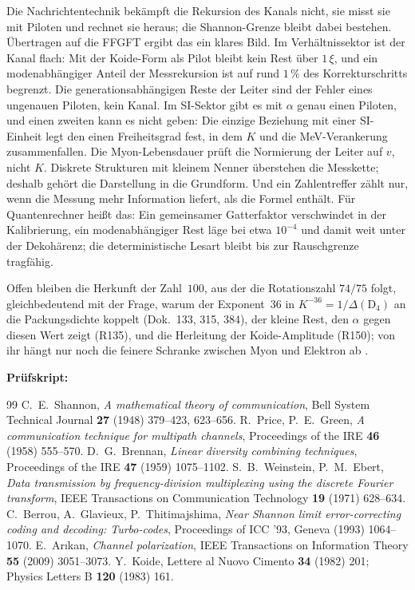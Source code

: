 Die Nachrichtentechnik bekämpft die Rekursion des Kanals nicht, sie misst sie mit Piloten und rechnet
sie heraus; die Shannon-Grenze bleibt dabei bestehen. Übertragen auf die FFGFT ergibt das ein klares
Bild. Im Verhältnissektor ist der Kanal flach: Mit der Koide-Form als Pilot bleibt kein Rest über
$1\,\xi$, und ein modenabhängiger Anteil der Messrekursion ist auf rund $1\,\%$ des Korrekturschritts
begrenzt. Die generationsabhängigen Reste der Leiter sind der Fehler eines ungenauen Piloten, kein
Kanal. Im SI-Sektor gibt es mit $\alpha$ genau einen Piloten, und einen zweiten kann es nicht geben: Die
einzige Beziehung mit einer SI-Einheit legt den einen Freiheitsgrad fest, in dem $K$ und die
MeV-Verankerung zusammenfallen. Die Myon-Lebensdauer prüft die Normierung der Leiter auf $v$, nicht $K$. Diskrete Strukturen mit kleinem Nenner überstehen die Messkette; deshalb gehört die Darstellung in
die Grundform. Und ein Zahlentreffer zählt nur, wenn die Messung mehr Information liefert, als die
Formel enthält. Für Quantenrechner heißt das: Ein gemeinsamer Gatterfaktor verschwindet in der
Kalibrierung, ein modenabhängiger Rest läge bei etwa $10^{-4}$ und damit weit unter der Dekohärenz;
die deterministische Lesart bleibt bis zur Rauschgrenze tragfähig.

Offen bleiben die Herkunft der Zahl~$100$, aus der die Rotationszahl $74/75$ folgt, gleichbedeutend
mit der Frage, warum der Exponent~$36$ in $K^{-36}=1/\Delta(\mathrm{D}_4)$ an die Packungsdichte koppelt
(Dok.~133, 315, 384),
der kleine Rest, den $\alpha$ gegen diesen Wert zeigt (R135), und die Herleitung der Koide-Amplitude (R150); von ihr hängt nur noch die feinere Schranke zwischen Myon und
Elektron ab \SM.

\medskip
\noindent\textbf{Prüfskript:} 

\begin{thebibliography}{99}
 C.~E.~Shannon, \textit{A mathematical theory of communication}, Bell System Technical Journal \textbf{27} (1948) 379--423, 623--656.
 R.~Price, P.~E.~Green, \textit{A communication technique for multipath channels}, Proceedings of the IRE \textbf{46} (1958) 555--570.
 D.~G.~Brennan, \textit{Linear diversity combining techniques}, Proceedings of the IRE \textbf{47} (1959) 1075--1102.
 S.~B.~Weinstein, P.~M.~Ebert, \textit{Data transmission by frequency-division multiplexing using the discrete Fourier transform}, IEEE Transactions on Communication Technology \textbf{19} (1971) 628--634.
 C.~Berrou, A.~Glavieux, P.~Thitimajshima, \textit{Near Shannon limit error-correcting coding and decoding: Turbo-codes}, Proceedings of ICC '93, Geneva (1993) 1064--1070.
 E.~Arıkan, \textit{Channel polarization}, IEEE Transactions on Information Theory \textbf{55} (2009) 3051--3073.
 Y.~Koide, Lettere al Nuovo Cimento \textbf{34} (1982) 201; Physics Letters B \textbf{120} (1983) 161.
\end{thebibliography}
